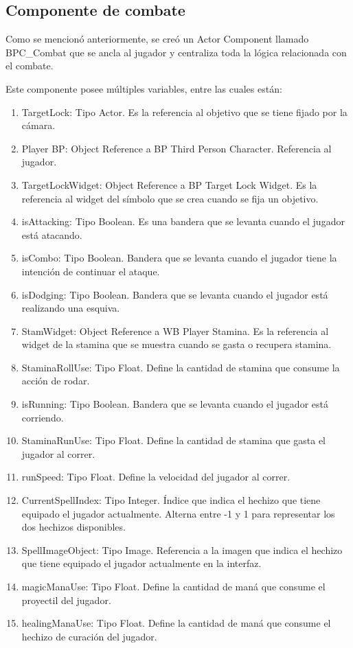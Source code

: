\documentclass[informe]{upropuesta}
\begin{document}
\subsection{Componente de combate}

Como se mencionó anteriormente, se creó un Actor Component llamado BPC\_Combat que se ancla al jugador y centraliza toda la lógica relacionada con el combate.

Este componente posee múltiples variables, entre las cuales están:

\begin{enumerate}
\item TargetLock: Tipo Actor. Es la referencia al objetivo que se tiene fijado por la cámara.
\item Player BP: Object Reference a BP Third Person Character. Referencia al jugador.
\item TargetLockWidget: Object Reference a BP Target Lock Widget. Es la referencia al widget del símbolo que se crea cuando se fija un objetivo.
\item isAttacking: Tipo Boolean. Es una bandera que se levanta cuando el jugador está atacando.
\item isCombo: Tipo Boolean. Bandera que se levanta cuando el jugador tiene la intención de continuar el ataque.
\item isDodging: Tipo Boolean. Bandera que se levanta cuando el jugador está realizando una esquiva.
\item StamWidget: Object Reference a WB Player Stamina. Es la referencia al widget de la stamina que se muestra cuando se gasta o recupera stamina.
\item StaminaRollUse: Tipo Float. Define la cantidad de stamina que consume la acción de rodar.
\item isRunning: Tipo Boolean. Bandera que se levanta cuando el jugador está corriendo.
\item StaminaRunUse: Tipo Float. Define la cantidad de stamina que gasta el jugador al correr.
\item runSpeed: Tipo Float. Define la velocidad del jugador al correr.
\item CurrentSpellIndex: Tipo Integer. Índice que indica el hechizo que tiene equipado el jugador actualmente. Alterna entre -1 y 1 para representar los dos hechizos disponibles.
\item SpellImageObject: Tipo Image. Referencia a la imagen que indica el hechizo que tiene equipado el jugador actualmente en la interfaz.
\item magicManaUse: Tipo Float. Define la cantidad de maná que consume el proyectil del jugador.
\item healingManaUse: Tipo Float. Define la cantidad de maná que consume el hechizo de curación del jugador.
\end{enumerate}
\end{document}
